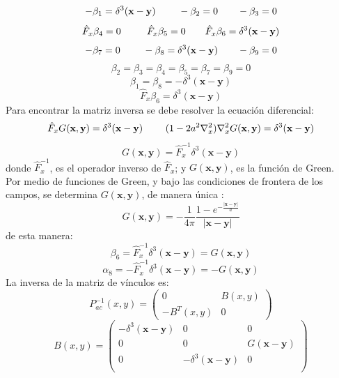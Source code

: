 \documentclass[a4paper,12pt]{article}
\begin{document}
\begin{equation}
-\beta_1=\delta^3(\textbf{x}-\textbf{y})  \ \ \  \ \ \ \ \\ \  -\beta_2=0\ \ \ \ \ \ \ \\ -\beta_3=0
\end{equation}
$$\hat{F}_x\beta_4=0  \ \ \  \ \ \ \ \\ \  \ \hat{F}_x\beta_5=0\ \ \ \ \ \ \ \\ \hat{F}_x\beta_6=\delta^3(\textbf{x}-\textbf{y})$$   
$$-\beta_7=0  \ \ \  \ \ \ \ \\ \  -\beta_8=\delta^3(\textbf{x}-\textbf{y})\ \ \ \ \ \ \ \\ -\beta_9=0$$   
$$\beta_2=\beta_3=\beta_4=\beta_5=\beta_7=\beta_9=0$$
$$\beta_1=\beta_8=-\delta^3(\textbf{x}-\textbf{y})$$
$$\hat{F}_x\beta_6=\delta^3(\textbf{x}-\textbf{y})$$
Para encontrar la matriz inversa se debe resolver la ecuación diferencial:
\begin{equation}
\hat{F}_xG(\textbf{x},\textbf{y})=\delta^3(\textbf{x}-\textbf{y}) \ \ \ \ \  \ \ \\ \ (1-2a^2\nabla^2_x)\nabla^2_xG(\textbf{x},\textbf{y})=\delta^3(\textbf{x}-\textbf{y})
\end{equation}
$$G(\textbf{x},\textbf{y})=\hat{F}_x^{-1}\delta^3(\textbf{x}-\textbf{y})$$
donde $\hat{F}_x^{-1}$, es el operador inverso de $\hat{F}_x$; y $G(\textbf{x},\textbf{y})$, es la función de Green.
\\

Por medio de funciones de Green, y bajo las condiciones de frontera de los campos, se determina $G(\textbf{x},\textbf{y})$, de manera única \cite{podolsky}: 
\begin{equation}
G(\textbf{x},\textbf{y})=-\frac{1}{4\pi}\frac{1-e^{-\frac{|\textbf{x}-\textbf{y}|}{a}}}{|\textbf{x}-\textbf{y}|} 
\end{equation}
de esta manera:
\begin{equation}
\beta_6=\hat{F}_x^{-1}\delta^3(\textbf{x}-\textbf{y})=G(\textbf{x},\textbf{y}) 
\end{equation}
$$\alpha_8=-\hat{F}_x^{-1}\delta^3(\textbf{x}-\textbf{y})=-G(\textbf{x},\textbf{y}) $$
La inversa de la matriz de vínculos es:
\begin{equation}
P_{ac}^{-1}(x,y)=\left(\begin{matrix}
 0&B(x,y) \\
 -B^T(x,y)&0  
\end{matrix}\right)
\end{equation} 
\begin{equation}
B(x,y)=\left(\begin{matrix}
-\delta^3(\textbf{x}-\textbf{y}) & 0 & 0 \\
 0 & 0 &G(\textbf{x}-\textbf{y})\\
 0 & - \delta^3(\textbf{x}-\textbf{y}) & 0  \\
\end{matrix}\right) 
\end{equation}
\\
\end{document}
